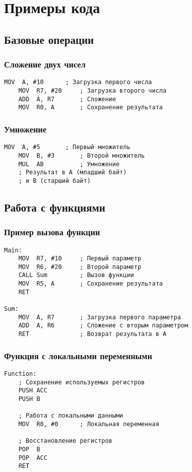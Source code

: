 \documentclass[a4paper, 12pt]{article}
\begin{document}
\section{Примеры кода}
\subsection{Базовые операции}
\subsubsection{Сложение двух чисел}
\begin{lstlisting}[language={mc51}]
    MOV  A, #10      ; Загрузка первого числа
    MOV  R7, #20     ; Загрузка второго числа
    ADD  A, R7       ; Сложение
    MOV  R0, A       ; Сохранение результата
\end{lstlisting}

\subsubsection{Умножение}
\begin{lstlisting}[language={mc51}]
    MOV  A, #5       ; Первый множитель
    MOV  B, #3       ; Второй множитель
    MUL  AB          ; Умножение
    ; Результат в A (младший байт)
    ; и B (старший байт)
\end{lstlisting}

\subsection{Работа с функциями}
\subsubsection{Пример вызова функции}
\begin{lstlisting}[language={mc51}]
Main:
    MOV  R7, #10     ; Первый параметр
    MOV  R6, #20     ; Второй параметр
    CALL Sum         ; Вызов функции
    MOV  R5, A       ; Сохранение результата
    RET

Sum:
    MOV  A, R7       ; Загрузка первого параметра
    ADD  A, R6       ; Сложение с вторым параметром
    RET              ; Возврат результата в A
\end{lstlisting}

\subsubsection{Функция с локальными переменными}
\begin{lstlisting}[language={mc51}]
Function:
    ; Сохранение используемых регистров
    PUSH ACC
    PUSH B
    
    ; Работа с локальными данными
    MOV  R0, #0      ; Локальная переменная
    
    ; Восстановление регистров
    POP  B
    POP  ACC
    RET
\end{lstlisting}
\end{document}
